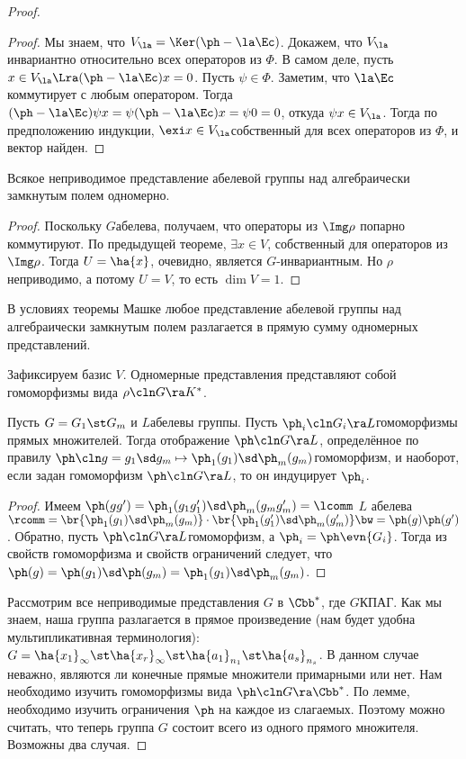 \documentclass[a4paper]{article}
\begin{document}
\begin{proof}
\begin{proof}
Мы знаем, что $V_\la = \Ker(\ph - \la \Ec)$. Докажем, что $V_\la$ инвариантно  относительно всех операторов
из $\Phi$. В самом деле, пусть $x \in V_\la \Lra (\ph - \la \Ec)x = 0$. Пусть $\psi \in \Phi$. Заметим, что
$\la \Ec$ коммутирует с любым оператором. Тогда $(\ph - \la \Ec)\psi x = \psi (\ph - \la \Ec) x = \psi 0 =
0$, откуда $\psi x \in V_\la$. Тогда по предположению индукции, $\exi x \in V_\la$\т собственный для всех
операторов из $\Phi$, и вектор найден.
\end{proof}

\begin{theorem}
Всякое неприводимое представление абелевой группы над алгебраически замкнутым полем одномерно.
\end{theorem}
\begin{proof}
Поскольку $G$\т абелева, получаем, что операторы из $\Img \rho$ попарно  коммутируют. По предыдущей теореме,
$\exi x \in V$, собственный для операторов из $\Img \rho$. Тогда $U = \ha{x}$, очевидно, является
$G$-инвариантным. Но $\rho$ неприводимо, а потому $U = V$, то есть $\dim V = 1$.
\end{proof}

\begin{imp}
В условиях теоремы Машке любое представление абелевой группы над алгебраически  замкнутым полем разлагается в
прямую сумму одномерных представлений.
\end{imp}

Зафиксируем базис $V$. Одномерные представления представляют собой  гомоморфизмы вида
$\rho\cln G \ra K^*$.

\begin{lemma}
Пусть $G=G_1\st G_m$ и $L$\т абелевы группы. Пусть $\ph_i\cln G_i \ra L$\т  гомоморфизмы прямых множителей.
Тогда отображение $\ph\cln G \ra L$, определённое по правилу $\ph\cln g = g_1\sd g_m \mapsto \ph_1(g_1)\sd
\ph_m(g_m)$\т гомоморфизм, и наоборот, если задан гомоморфизм $\ph\cln G \ra L$, то он индуцирует $\ph_i$.
\end{lemma}
\begin{proof}
Имеем $\ph(gg')=\ph_1(g_1g_1')\sd \ph_m(g_mg_m')= \lcomm$ $L$ абелева  $\rcomm = \br{\ph_1(g_1)\sd
\ph_m(g_m)}\cdot \br{\ph_1(g_1')\sd \ph_m(g_m')}\bw=\ph(g)\ph(g')$.
Обратно, пусть $\ph\cln G \ra L$\т гомоморфизм, а $\ph_i = \ph\evn{G_i}$.  Тогда из свойств гомоморфизма и
свойств ограничений следует, что $\ph(g)=\ph(g_1)\sd \ph(g_m)=\ph_1(g_1)\sd \ph_m(g_m)$.
\end{proof}

Рассмотрим  все неприводимые представления $G$ в $\Cbb^*$, где $G$\т КПАГ. Как мы знаем, наша группа
разлагается в прямое произведение (нам будет удобна  мультипликативная терминология): $G = \ha{x_1}_\infty\st
\ha{x_r}_\infty\st\ha{a_1}_{n_1}\st \ha{a_s}_{n_s}$. В данном случае неважно, являются ли конечные прямые
множители примарными или нет. Нам необходимо изучить гомоморфизмы вида $\ph\cln G \ra \Cbb^*$. По лемме,
необходимо изучить ограничения $\ph$ на каждое из слагаемых. Поэтому можно считать, что теперь группа $G$
состоит всего из одного прямого множителя. Возможны два случая.


\end{proof}
\end{document}
